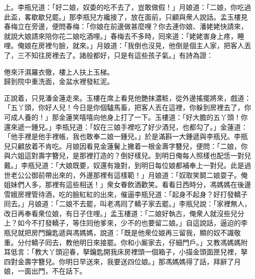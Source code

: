 上。李瓶兒道：「好二娘，奴委的吃不去了，豈敢做假！」月娘道：「二娘，你吃過此盃，畧歇歇兒罷。」那李瓶兒方纔接了，放在面前，只顧與衆人說話。孟玉樓見春梅立在旁邊，便問春梅：「你娘在前邊做甚麼哩？{}你去連你娘、潘姥姥快請來，就說大娘請來陪你花二娘吃酒哩。」春梅去不多時，囘來道：「姥姥害身上疼，睡哩。俺娘在房裡勻臉，就來。」月娘道：「我倒也沒見，他倒是個主人家，把客人丟了，三不知往房裡去了。諸般都好，只是有這些孩子氣。」{}有詩為證：

\begin{myquote}
倦來汗濕羅衣徹，樓上人扶上玉梯。\\歸到院中重洗面，金盆水裡發紅泥。
\end{myquote}

正說着，只見潘金蓮走來。玉樓在席上看見他艷抹濃粧，從外邊搖擺將來，戲道：「五丫頭，你好人兒！今日是你個驢馬畜，把客人丟在這裡，你躲到房裡去了，你可成人養的！」那金蓮笑嘻嘻向他身上打了一下。{}玉樓道：「好大膽的五丫頭！你還來遞一鍾兒。」李瓶兒道：「奴在三娘手裡吃了好少酒兒，也都勾了。」金蓮道：「他手裡是他手裡帳，我也敢奉二娘一鍾兒。」於是滿斟一大鍾遞與李瓶兒。李瓶兒只顧放着不肯吃。月娘因看見金蓮鬢上撇着一根金壽字簪兒，便問：「二娘，你與六姐這對壽字簪兒，是那裡打造的？倒好樣兒。到明日俺每人照樣也配恁一對兒戴。」李瓶兒道：「大娘既要，奴還有幾對，到明日每位娘都補奉上一對兒。此是過世老公公御前帶出來的，外邊那裡有這樣範！」月娘道：「奴取笑鬬二娘耍子。俺姐妹們人多，那裡有這些相送！」衆女眷飲酒歡笑。看看日西時分，馮媽媽在後邊雪娥房裡管待酒，吃的臉紅紅的出來，催逼李瓶兒道：「起身不起身？好打發轎子囘去。」月娘道：「二娘不去罷，叫老馮囘了轎子家去罷。」李瓶兒說：「家裡無人，改日再奉看衆位娘，有日子住哩。」孟玉樓道：「二娘好執古，俺衆人就沒些兒分上？如今不打發轎子，等住囘他爹來，少不的也要留二娘。」{}自這說話，逼迫的李瓶兒就把房門鑰匙遞與馮媽媽，說道：「既是他衆位娘再三留我，顯的奴不識敬重。分付轎子囘去，教他明日來接罷。你和小厮家去，仔細門戶。」又教馮媽媽附耳低言：「教大丫頭迎春，拏鑰匙開我床房裡頭一個箱子，小描金頭面匣兒裡，拏四對金壽字簪兒。你明日早送來，我要送四位娘。」那馮媽媽得了話，拜辭了月娘，一面出門，不在話下。

